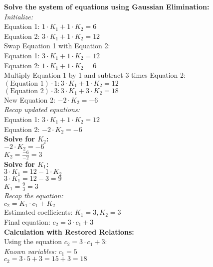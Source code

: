 \textbf{Solve the system of equations using Gaussian Elimination:} \\
\textit{Initialize:} \\
Equation 1: \( 1 \cdot K_1 + 1 \cdot K_2 = 6 \) \\
Equation 2: \( 3 \cdot K_1 + 1 \cdot K_2 = 12 \) \\

Swap Equation 1 with Equation 2: \\
Equation 1: \( 3 \cdot K_1 + 1 \cdot K_2 = 12 \) \\
Equation 2: \( 1 \cdot K_1 + 1 \cdot K_2 = 6 \) \\

Multiply Equation 1 by 1 and subtract 3 times Equation 2: \\
\((\text{Equation 1}) \cdot 1: 3 \cdot K_1 + 1 \cdot K_2 = 12 \) \\
\((\text{Equation 2}) \cdot 3: 3 \cdot K_1 + 3 \cdot K_2 = 18 \) \\
New Equation 2: \( -2 \cdot K_2 = -6 \) \\

\textit{Recap updated equations:} \\
Equation 1: \( 3 \cdot K_1 + 1 \cdot K_2 = 12 \) \\
Equation 2: \( -2 \cdot K_2 = -6 \) \\

\textbf{Solve for \( K_2 \):} \\
\( -2 \cdot K_2 = -6 \) \\
\( K_2 = \frac{-6}{-2} = 3 \) \\

\textbf{Solve for \( K_1 \):} \\
\( 3 \cdot K_1 = 12 - 1 \cdot K_2 \) \\
\( 3 \cdot K_1 = 12 - 3 = 9 \) \\
\( K_1 = \frac{9}{3} = 3 \) \\

\textit{Recap the equation:} \\
\( c_2 = K_1 \cdot c_1 + K_2 \) \\
Estimated coefficients: \( K_1 = 3, K_2 = 3 \) \\
Final equation: \( c_2 = 3 \cdot c_1 + 3 \) \\

\textbf{Calculation with Restored Relations:} \\
Using the equation \( c_2 = 3 \cdot c_1 + 3 \): \\
\textit{Known variables:} \( c_1 = 5 \) \\
\( c_2 = 3 \cdot 5 + 3 = 15 + 3 = 18 \) \\

